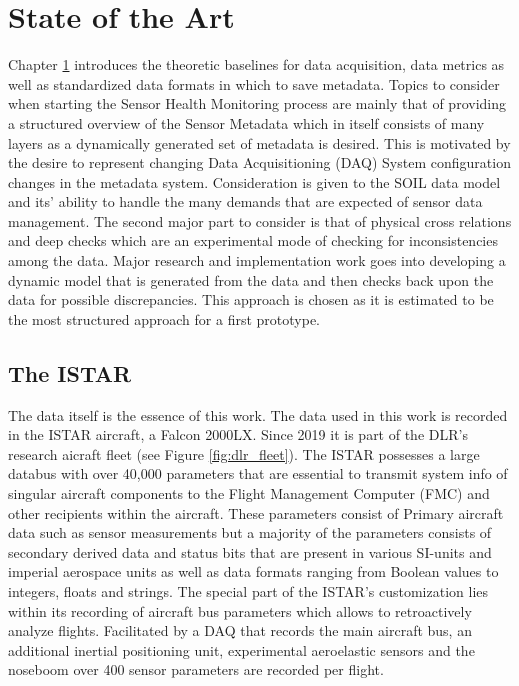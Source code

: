 

\chapter{State of the Art}
\label{chap:2}
Chapter \ref{chap:2} introduces the theoretic baselines for data acquisition, data metrics as well as standardized data formats in which to save metadata. Topics to consider when starting the Sensor Health Monitoring process are mainly that of providing a structured overview of the Sensor Metadata which in itself consists of many layers as a dynamically generated set of metadata is desired. This is motivated by the desire to represent changing Data Acquisitioning (DAQ) System configuration changes in the metadata system. Consideration is given to the SOIL data model and its' ability to handle the many demands that are expected of sensor data management. \cite{behrens_domain-specific_2021}
The second major part to consider is that of physical cross relations and deep checks which are an experimental mode of checking for inconsistencies among the data. Major research and implementation work goes into developing a dynamic model that is generated from the data and then checks back upon the data for possible discrepancies. This approach is chosen as it is estimated to be the most structured approach for a first prototype.


\section{The ISTAR}
\label{chap:meet_the_istar}
The data itself is the essence of this work. The data used in this work is recorded in the ISTAR aircraft, a Falcon 2000LX. Since 2019 it is part of the DLR's research aicraft fleet (see Figure \ref{fig:dlr_fleet}). The ISTAR possesses a large databus with over 40,000 parameters that are essential to transmit system info of singular aircraft components to the Flight Management Computer (FMC) and other recipients within the aircraft. These parameters consist of Primary aircraft data such as sensor measurements but a majority of the parameters consists of secondary derived data and status bits that are present in various SI-units and imperial aerospace units as well as data formats ranging from Boolean values to integers, floats and strings. The special part of the ISTAR's customization lies within its recording of aircraft bus parameters which allows to retroactively analyze flights. Facilitated by a DAQ that records the main aircraft bus, an additional inertial positioning unit, experimental aeroelastic sensors and the noseboom over 400 sensor parameters are recorded per flight.

